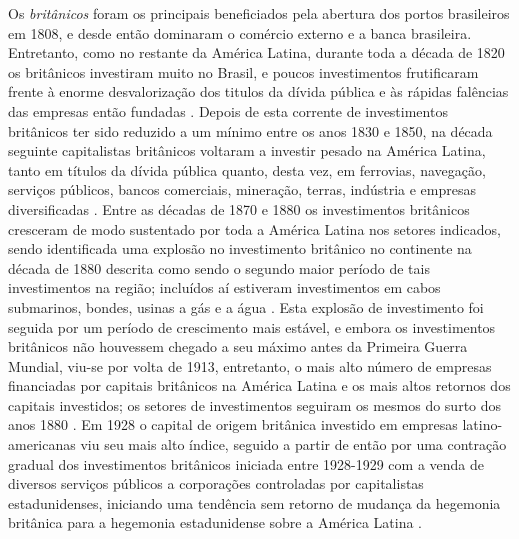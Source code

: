 Os \textit{britânicos} foram os principais beneficiados pela abertura dos portos brasileiros em 1808, e desde então dominaram o comércio externo e a banca brasileira. Entretanto, como no restante da América Latina, durante toda a década de 1820 os britânicos investiram muito no Brasil, e poucos investimentos frutificaram frente à enorme desvalorização dos titulos da dívida pública e às rápidas falências das empresas então fundadas \cite{rippy_britlat_1947}. Depois de esta corrente de investimentos britânicos ter sido reduzido a um mínimo entre os anos 1830 e 1850, na década seguinte capitalistas britânicos voltaram a investir pesado na América Latina, tanto em títulos da dívida pública quanto, desta vez, em ferrovias, navegação, serviços públicos, bancos comerciais, mineração, terras, indústria e empresas diversificadas \cite{rippy_britlat_1948}. Entre as décadas de 1870 e 1880 os investimentos britânicos cresceram de modo sustentado por toda a América Latina nos setores indicados, sendo identificada uma explosão no investimento britânico no continente na década de 1880 descrita como sendo o segundo maior período de tais investimentos na região; incluídos aí estiveram investimentos em cabos submarinos, bondes, usinas a gás e a água \cite{rippy_britlat_1949}. Esta explosão de investimento foi seguida por um período de crescimento mais estável, e embora os investimentos britânicos não houvessem chegado a seu máximo antes da Primeira Guerra Mundial, viu-se por volta de 1913, entretanto, o mais alto número de empresas financiadas por capitais britânicos na América Latina e os mais altos retornos dos capitais investidos; os setores de investimentos seguiram os mesmos do surto dos anos 1880 \cite{rippy_britlat2_1947}. Em 1928 o capital de origem britânica investido em empresas latino-americanas viu seu mais alto índice, seguido a partir de então por uma contração gradual dos investimentos britânicos iniciada entre 1928-1929 com a venda de diversos serviços públicos a corporações controladas por capitalistas estadunidenses, iniciando uma tendência sem retorno de mudança da hegemonia britânica para a hegemonia estadunidense sobre a América Latina \cite{rippy_britlat_1954}.

